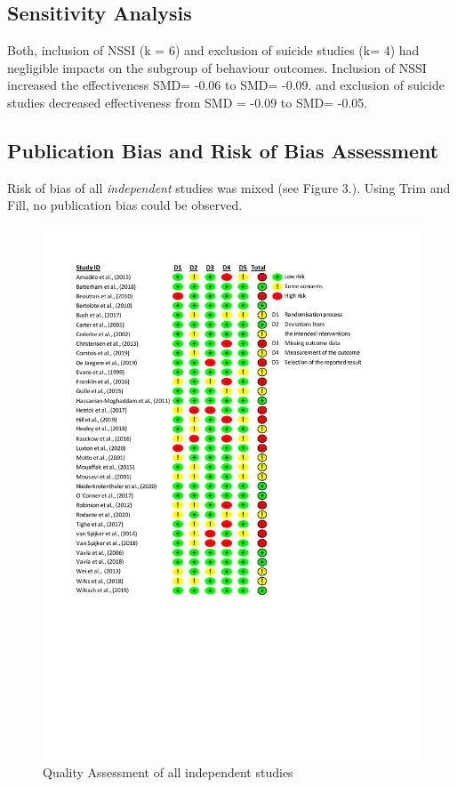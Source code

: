 \documentclass[
  english,
  man]{apa6}
\begin{document}
\hypertarget{sensitivity-analysis-1}{%
\subsection{Sensitivity Analysis}\label{sensitivity-analysis-1}}

Both, inclusion of NSSI (k = 6) and exclusion of suicide studies (k= 4) had negligible impacts on the subgroup of behaviour outcomes. Inclusion of NSSI increased the effectiveness SMD= -0.06 to SMD= -0.09. and exclusion of suicide studies decreased effectiveness from SMD = -0.09 to SMD= -0.05.

\hypertarget{publication-bias-and-risk-of-bias-assessment}{%
\subsection{Publication Bias and Risk of Bias Assessment}\label{publication-bias-and-risk-of-bias-assessment}}

Risk of bias of all \emph{independent} studies was mixed (see Figure 3.). Using Trim and Fill, no publication bias could be observed.

\begin{figure}
\centering
\includegraphics{01_Plots/RoB-II.pdf}
\caption{Quality Assessment of all independent studies}
\end{figure}
\end{document}

